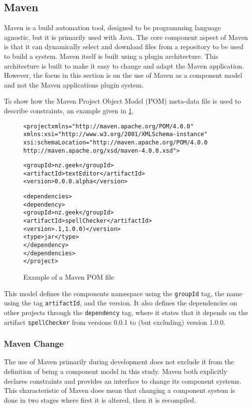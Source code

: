 \subsection{Maven}
Maven is a build automation tool, designed to be programming language agnostic, but it is primarily used with Java.
The core component aspect of Maven is that it can dynamically select and download files from a repository to be used to build a system.
Maven itself is built using a plugin architecture.
This architecture is built to make it easy to change and adapt the Maven application.
However, the focus in this section is on the use of Maven as a component model and not the Maven applications plugin system.

To show how the Maven Project Object Model (POM) meta-data file is used to describe constraints,
 an example given in \ref{mavenmetadata}. 

\begin{figure}[htp]
\begin{center}
\begin{alltt}
<project xmlns="http://maven.apache.org/POM/4.0.0"
  xmlns:xsi="http://www.w3.org/2001/XMLSchema-instance"
  xsi:schemaLocation="http://maven.apache.org/POM/4.0.0
                      http://maven.apache.org/xsd/maven-4.0.0.xsd">

  <groupId>nz.geek</groupId>
  <artifactId>textEditor</artifactId>
  <version>0.0.0.alpha</version>

  <dependencies>
    <dependency>
      <groupId>nz.geek</groupId>
      <artifactId>spellChecker</artifactId>
      <version>.1,1.0.0)</version>
      <type>jar</type>
     </dependency>
  </dependencies>
</project>
\end{alltt}
  \caption{Example of a Maven POM file}
  \label{mavenmetadata}
\end{center}
\end{figure}

This model defines the components namespace using the \texttt{groupId} tag, the name using the tag \texttt{artifactId}, and the version.
It also defines the dependencies on other projects through the \texttt{dependency} tag,
where it states that it depends on the artifact \texttt{spellChecker} from versions 0.0.1 to (but excluding) version 1.0.0.

\subsubsection{Maven Change}
The use of Maven primarily during development does not exclude it from the definition of being a component model in this study.
Maven both explicitly declares constraints and provides an interface to change its component systems. 
This characteristic of Maven does mean that changing a component system is done in two stages where first it is altered, then it is recompiled.

